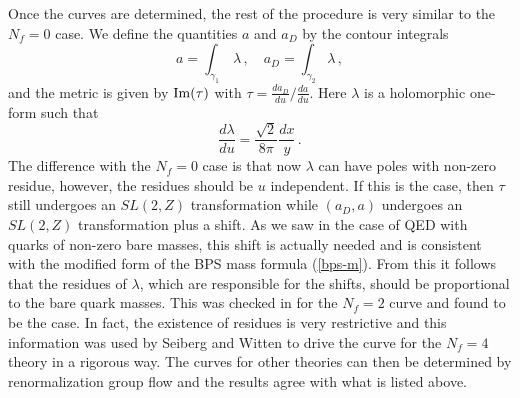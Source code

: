 Once the curves are determined, the rest of the procedure is very
similar to the $N_f=0$ case. We define the quantities $a$ and $a_D$ by
the contour integrals
$$
a=\int_{\gamma_1} \, \lambda\,,\quad a_D=\int_{\gamma_2}\lambda\,,
$$
and the metric is given by ${\rm Im}(\tau)$ with $\tau=\frac{da_D}{du}/
\frac{da}{du}$. Here $\lambda$ is a holomorphic one-form such that
$$ 
\frac{d\lambda}{du}=\frac{\sqrt 2}{8\pi}\frac{dx}{y}\,.
$$
The difference with the $N_f=0$ case is that now $\lambda$ can have
poles with non-zero residue, however, the residues should be $u$
independent. If this is the case, then $\tau$ still undergoes an
$SL(2,Z)$ transformation while $(a_D, a)$ undergoes an $SL(2,Z)$
transformation plus a shift. As we saw in the case of QED with quarks
of non-zero bare masses, this shift is actually needed and is
consistent with the modified form of the BPS mass formula
(\ref{bps-m}). From this it follows that the residues of $\lambda$,
which are responsible for the shifts, should be proportional to the
bare quark masses. This was checked in \cite{SW2} for the $N_f=2$
curve and found to be the case. In fact, the existence of residues is
very restrictive and this information was used by Seiberg and Witten
to drive the curve for the $N_f=4$ theory in a rigorous way. The
curves for other theories can then be determined by renormalization
group flow and the results agree with what is listed above.
